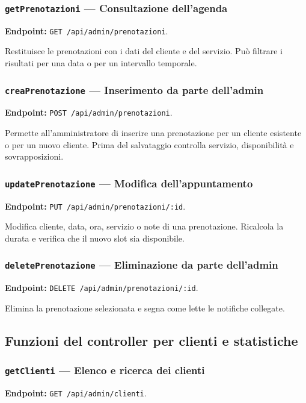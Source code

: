 \documentclass[12pt,a4paper]{article}
\begin{document}
\subsubsection{\texttt{getPrenotazioni} --- Consultazione dell'agenda}
\textbf{Endpoint:} \texttt{GET /api/admin/prenotazioni}.

Restituisce le prenotazioni con i dati del cliente e del servizio. Può
filtrare i risultati per una data o per un intervallo temporale.

\subsubsection{\texttt{creaPrenotazione} --- Inserimento da parte dell'admin}
\textbf{Endpoint:} \texttt{POST /api/admin/prenotazioni}.

Permette all'amministratore di inserire una prenotazione per un cliente
esistente o per un nuovo cliente. Prima del salvataggio controlla servizio,
disponibilità e sovrapposizioni.

\subsubsection{\texttt{updatePrenotazione} --- Modifica dell'appuntamento}
\textbf{Endpoint:} \texttt{PUT /api/admin/prenotazioni/:id}.

Modifica cliente, data, ora, servizio o note di una prenotazione. Ricalcola la
durata e verifica che il nuovo slot sia disponibile.

\subsubsection{\texttt{deletePrenotazione} --- Eliminazione da parte dell'admin}
\textbf{Endpoint:} \texttt{DELETE /api/admin/prenotazioni/:id}.

Elimina la prenotazione selezionata e segna come lette le notifiche collegate.

\subsection{Funzioni del controller per clienti e statistiche}

\subsubsection{\texttt{getClienti} --- Elenco e ricerca dei clienti}
\textbf{Endpoint:} \texttt{GET /api/admin/clienti}.
\end{document}
